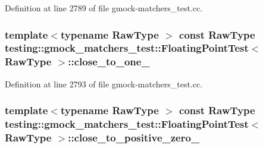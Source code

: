 Definition at line 2789 of file gmock-\/matchers\+\_\+test.\+cc.

\subsubsection[{\texorpdfstring{close\+\_\+to\+\_\+one\+\_\+}{close_to_one_}}]{\setlength{\rightskip}{0pt plus 5cm}template$<$typename Raw\+Type $>$ const Raw\+Type {\bf testing\+::gmock\+\_\+matchers\+\_\+test\+::\+Floating\+Point\+Test}$<$ Raw\+Type $>$\+::close\+\_\+to\+\_\+one\+\_\+\hspace{0.3cm}{\ttfamily [protected]}}\hypertarget{classtesting_1_1gmock__matchers__test_1_1_floating_point_test_a34c97dc5dc07ea62764de87fdd8b7764}{}\label{classtesting_1_1gmock__matchers__test_1_1_floating_point_test_a34c97dc5dc07ea62764de87fdd8b7764}


Definition at line 2793 of file gmock-\/matchers\+\_\+test.\+cc.

\subsubsection[{\texorpdfstring{close\+\_\+to\+\_\+positive\+\_\+zero\+\_\+}{close_to_positive_zero_}}]{\setlength{\rightskip}{0pt plus 5cm}template$<$typename Raw\+Type $>$ const Raw\+Type {\bf testing\+::gmock\+\_\+matchers\+\_\+test\+::\+Floating\+Point\+Test}$<$ Raw\+Type $>$\+::close\+\_\+to\+\_\+positive\+\_\+zero\+\_\+\hspace{0.3cm}{\ttfamily [protected]}}\hypertarget{classtesting_1_1gmock__matchers__test_1_1_floating_point_test_a750555206ab9d5959d6dc84f8a760c57}{}\label{classtesting_1_1gmock__matchers__test_1_1_floating_point_test_a750555206ab9d5959d6dc84f8a760c57}



